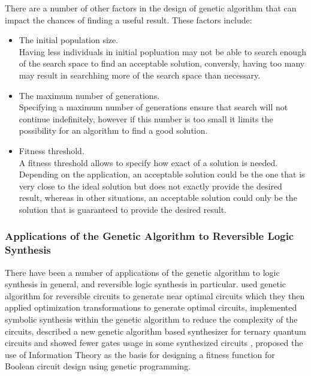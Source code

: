 There are a number of other factors in the design of genetic algorithm that can impact the chances of finding a useful result. 
These factors include:
\begin{itemize}
 \item The initial population size.
\\ Having less individuals in initial popluation may not be able to search enough of the search space to 
find an acceptable solution, conversly, having too many may result in searchhing more of the search space than necessary.
 \item The maximum number of generations.
\\ Specifying a maximum number of generations ensure that search will not continue indefinitely, however if this number is too 
small it limits the possibility for an algorithm to find a good solution.
 \item Fitness threshold.
\\A fitness threshold allows to specify how exact of a solution is needed. Depending on the application, an acceptable solution could be the one that is very close to the ideal solution but does not exactly provide the
desired result, whereas in other situations, an acceptable solution could only be the solution that is guaranteed to provide the desired result. 
\end{itemize}
 

\subsubsection{Applications of the Genetic Algorithm to Reversible Logic Synthesis}

There have been a number of applications of the genetic algorithm to logic synthesis in general, and reversible logic synthesis in 
particular. \cite{Lukac2003} used genetic algorithm for reversible circuits to generate near optimal circuits which they then applied 
optimization transformations to generate optimal circuits, 
\cite{Lukac2008} implemented symbolic synthesis within the genetic algorithm to reduce the complexity of the circuits, 
\cite{Khan2004} described a new genetic algorithm based synthesizer for ternary quantum circuits and showed fewer gates usage in some synthesized circuits , 
\cite{Aguirre2003} proposed the use of Information Theory as the basis for designing a fitness function for Boolean circuit design using 
genetic programming.